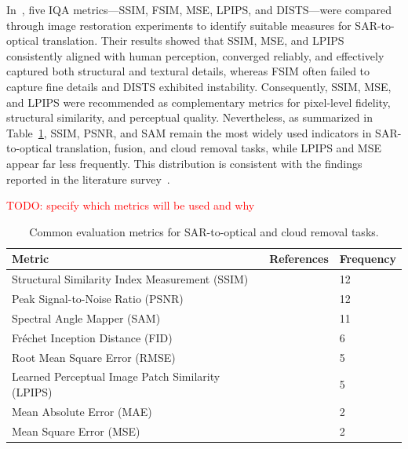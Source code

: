 In~\cite{quality_assessment_S2OT}, five IQA metrics—SSIM, FSIM, MSE, LPIPS, and DISTS—were compared through image restoration experiments to identify suitable measures for SAR-to-optical translation. Their results showed that SSIM, MSE, and LPIPS consistently aligned with human perception, converged reliably, and effectively captured both structural and textural details, whereas FSIM often failed to capture fine details and DISTS exhibited instability. Consequently, SSIM, MSE, and LPIPS were recommended as complementary metrics for pixel-level fidelity, structural similarity, and perceptual quality. Nevertheless, as summarized in Table~\ref{tab:iqa}, SSIM, PSNR, and SAM remain the most widely used indicators in SAR-to-optical translation, fusion, and cloud removal tasks, while LPIPS and MSE appear far less frequently. This distribution is consistent with the findings reported in the literature survey~\cite{sar_2_opt_CGAN_survey_taxonomy}.

\textcolor{red}{TODO: specify which metrics will be used and why}

\begin{table}[h!]
\centering
\begin{tabular}{lll}
\toprule
\textbf{Metric} & \textbf{References} & \textbf{Frequency} \\
\midrule
Structural Similarity Index Measurement (SSIM)~\cite{iqa_ssim}
 & \cite{CR_Advances_Review_ORS, RS_Data_Fusion_GANs_sota, DiffCR, c_diffusion_s2o, s2o_ViT_cGAN, S2MS_GAN, c_guided_fus_s2ot, transfusion_cr, trans_gan_CF, hvt_cgan, msf_gan, diffusion_memory} 
 & 12 \\
Peak Signal-to-Noise Ratio (PSNR)~\cite{iqa_psnr}
 & \cite{CR_Advances_Review_ORS, DiffCR, CR_RS_spati_atten_GAN, s2o_ViT_cGAN, CR_RS_GAN_s2o, S2MS_GAN, c_guided_fus_s2ot, transfusion_cr, trans_gan_CF, hvt_cgan, msf_gan, diffusion_memory} 
 & 12 \\
Spectral Angle Mapper (SAM)~\cite{iqa_sam}
 & \cite{aCGAN_fuse_sar_MS, RS_Data_Fusion_GANs_sota, CR_RS_GAN_s2o, S2MS_GAN, c_guided_fus_s2ot, transfusion_cr, trans_gan_CF, cond_brownian, hvt_cgan, msf_gan} 
 & 11 \\
Fréchet Inception Distance (FID)~\cite{iqa_fid}
 & \cite{DiffCR, c_diffusion_s2o, s2o_ViT_cGAN, cond_brownian, hvt_cgan, msf_gan} 
 & 6 \\
Root Mean Square Error (RMSE) 
 & \cite{aCGAN_fuse_sar_MS, CR_Advances_Review_ORS, RS_Data_Fusion_GANs_sota, CR_RS_GAN_s2o, c_guided_fus_s2ot} 
 & 5 \\
Learned Perceptual Image Patch Similarity (LPIPS)~\cite{iqa_lpips}
 & \cite{CR_Advances_Review_ORS, DiffCR, S2MS_GAN, cond_brownian, diffusion_memory} 
 & 5 \\
Mean Absolute Error (MAE) 
 & \cite{CR_RS_GAN_s2o, c_guided_fus_s2ot} 
 & 2 \\
Mean Square Error (MSE) 
 & \cite{CR_RS_spati_atten_GAN, trans_gan_CF} 
 & 2 \\
\bottomrule
\end{tabular}
\caption{Common evaluation metrics for SAR-to-optical and cloud removal tasks.}
\label{tab:iqa}
\end{table}

